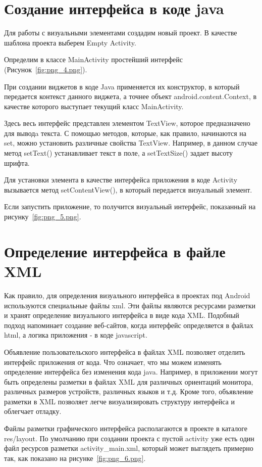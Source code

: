 \section{Создание интерфейса в коде java}
Для работы с визуальными элементами создадим новый проект. В качестве
шаблона проекта выберем Empty Activity.\par
Определим в классе MainActivity простейший интерфейс
(Рисунок~\ref{fig:png_4.png}).

При создании виджетов в коде Java применяется их конструктор, в который
передается контекст данного виджета, а точнее объект
android.content.Context, в качестве которого выступает текущий класс
MainActivity.\par
Здесь весь интерфейс представлен элементом TextView, которое
предназначено для выводa текста. С помощью методов, которые, как
правило, начинаются на set, можно установить различные свойства TextView.
Например, в данном случае метод setText() устанавливает текст в поле, а
setTextSize() задает высоту шрифта.\par
Для установки элемента в качестве интерфейса приложения в коде Activity
вызывается метод setContentView(), в который передается визуальный
элемент.\par
Если запустить приложение, то получится визуальный интерфейс, показанный
на рисунку~\ref{fig:png_5.png}.

\section{Определение интерфейса в файле XML}
Как правило, для определения визуального интерфейса в проектах под
Android используются специальные файлы xml. Эти файлы являются
ресурсами разметки и хранят определение визуального интерфейса в виде
кода XML. Подобный подход напоминает создание веб-сайтов, когда
интерфейс определяется в файлах html, а логика приложения - в коде
javascript.\par
Объявление пользовательского интерфейса в файлах XML позволяет
отделить интерфейс приложения от кода. Что означает, что мы можем
изменять определение интерфейса без изменения кода java. Например, в
приложении могут быть определены разметки в файлах XML для различных
ориентаций монитора, различных размеров устройств, различных языков и
т.д. Кроме того, объявление разметки в XML позволяет легче
визуализировать структуру интерфейса и облегчает отладку.\par
Файлы разметки графического интерфейса располагаются в проекте в
каталоге res/layout. По умолчанию при создании проекта с пустой activity уже
есть один файл ресурсов разметки activity\_main.xml, который может
выглядеть примерно так, как показано на рисунке~\ref{fig:png_6.png}.

